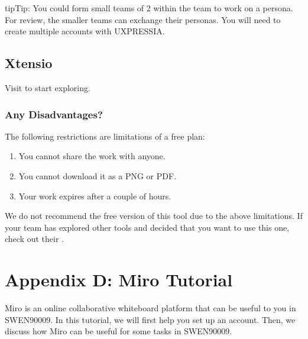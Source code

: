 \documentclass[letterpaper,10pt,english]{jupyterBook}
\begin{document}
\begin{sphinxadmonition}{tip}{Tip:}
\sphinxAtStartPar
You could form small teams of 2 within the team to work on a persona. For review, the smaller teams can
exchange their personas. You will need to create multiple accounts with UXPRESSIA.
\end{sphinxadmonition}


\section{Xtensio}
\label{\detokenize{appendices/appendix_c/personas_guide:xtensio}}
\sphinxAtStartPar
Visit  to start exploring.


\subsection{Any Disadvantages?}
\label{\detokenize{appendices/appendix_c/personas_guide:id4}}
\sphinxAtStartPar
The following restrictions are limitations of a free plan:
\begin{enumerate}
%
\item {} 
\sphinxAtStartPar
You cannot share the work with anyone.

\item {} 
\sphinxAtStartPar
You cannot download it as a PNG or PDF.

\item {} 
\sphinxAtStartPar
Your work expires after a couple of hours.

\end{enumerate}

\sphinxAtStartPar
We do not recommend the free version of this tool due to the above limitations.  If your team has explored other
tools and decided that you want to use this one, check out their
.


\chapter{Appendix D: Miro Tutorial}
\label{\detokenize{appendices/appendix_d/miro_guide:appendix-d-miro-tutorial}}\label{\detokenize{appendices/appendix_d/miro_guide::doc}}
\sphinxAtStartPar
Miro is an online collaborative whiteboard platform that can be useful to you in SWEN90009. In this tutorial, we
will first help you set up an account. Then, we discuss how Miro can be useful for some tasks in SWEN90009.
\end{document}
